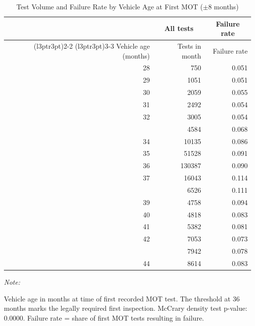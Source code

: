 \begin{table}[!h]
\centering
\caption{\label{tab:tab:density}Test Volume and Failure Rate by Vehicle Age at First MOT ($\pm$8 months)}
\centering
\begin{threeparttable}
\begin{tabular}[t]{rrr}
\toprule
\multicolumn{1}{c}{ } & \multicolumn{1}{c}{All tests} & \multicolumn{1}{c}{Failure rate} \\
\cmidrule(l{3pt}r{3pt}){2-2} \cmidrule(l{3pt}r{3pt}){3-3}
Vehicle age (months) & Tests in month & Failure rate\\
\midrule
28 & 750 & 0.051\\
29 & 1051 & 0.051\\
30 & 2059 & 0.055\\
31 & 2492 & 0.054\\
32 & 3005 & 0.054\\
\addlinespace
33 & 4584 & 0.068\\
34 & 10135 & 0.086\\
35 & 51528 & 0.091\\
36 & 130387 & 0.090\\
37 & 16043 & 0.114\\
\addlinespace
38 & 6526 & 0.111\\
39 & 4758 & 0.094\\
40 & 4818 & 0.083\\
41 & 5382 & 0.081\\
42 & 7053 & 0.073\\
\addlinespace
43 & 7942 & 0.078\\
44 & 8614 & 0.083\\
\bottomrule
\end{tabular}
\begin{tablenotes}
\item \textit{Note: } 
\item Vehicle age in months at time of first recorded MOT test. The threshold at 36 months marks the legally required first inspection. McCrary density test p-value: 0.0000. Failure rate = share of first MOT tests resulting in failure.
\end{tablenotes}
\end{threeparttable}
\end{table}
